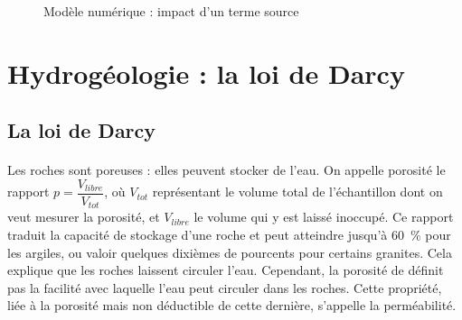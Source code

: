 \documentclass{article}
\begin{document}
\begin{figure}
    \centering
    \hfill
    \caption{Modèle numérique : impact d'un terme source}
    \label{fig:num_ts}
\end{figure}

\newpage
\section{Hydrogéologie : la loi de Darcy}
\subsection{La loi de Darcy}

\paragraph{} Les roches sont poreuses : elles peuvent stocker de l’eau. On appelle porosité le rapport $p=\dfrac{V_{libre}}{V_{tot}}$, où $V_{tot}$ représentant le volume total de l'échantillon dont on veut mesurer la porosité, et $V_{libre}$ le volume qui y est laissé inoccupé. Ce rapport traduit la capacité de stockage d'une roche et peut atteindre jusqu’à 60~\% pour les argiles, ou valoir quelques dixièmes de pourcents pour certains granites. Cela explique que les roches laissent circuler l’eau. Cependant, la porosité de définit pas la facilité avec laquelle l’eau peut circuler dans les roches. Cette propriété, liée à la porosité mais non déductible de cette dernière, s’appelle la perméabilité.
\end{document}
